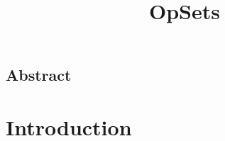 \documentclass[twocolumn,10pt]{article}
\begin{document}
\sloppy
\title{OpSets}
\author{}
\date{}
\maketitle

\subsection*{Abstract}

\section{Introduction}

\cite{Attiya:2016kh}

\end{document}
